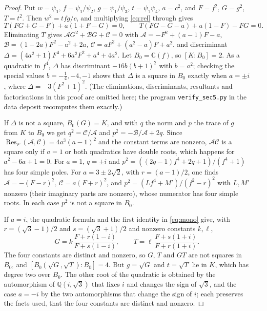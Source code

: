 \documentclass[11pt]{amsart}
\theoremstyle{definition}
\newcommand{\C}{\mathbb{C}}
\begin{document}
\begin{proof}
Put $w=\psi_1$, $f=\psi_1/\psi_2$, $g=\psi_1/\psi_3$, $t=\psi_1\psi_4$, $a=c^2$, and $F=f^2$, $G=g^2$,
$T=t^2$. Then $w^2=tfg/c$, and multiplying \eqref{eq:rel} through gives
\begin{equation}\label{eq:mono}
T(FG+G-F)+a(1+F-G)=0,\qquad T(FG-G-a)+a(1-F)-FG=0.
\end{equation}
Eliminating $T$ gives $\mathcal A G^2+\mathcal B G+\mathcal C=0$ with
$\mathcal A=-F^2+(a-1)F-a$, $\mathcal B=(1-2a)F^2-a^2+2a$, $\mathcal C=aF^2+(a^2-a)F+a^2$, and discriminant
$\Delta=(4a^2+1)F^4+6a^2F^2+a^4+4a^2$. Let $B_0=\C(f)$, so $[K:B_0]=2$. As a quadratic in $f^4$, $\Delta$ has
discriminant $-16b(b+1)^2$ with $b=a^2$; checking the special values $b=-\tfrac14,-4,-1$ shows that $\Delta$ is a
square in $B_0$ exactly when $a=\pm i$, where $\Delta=-3(F^2+1)^2$. (The eliminations, discriminants, resultants and
factorisations in this proof are omitted here; the program \texttt{verify\_sec5.py} in the data deposit recomputes
them exactly.)

If $\Delta$ is not a square, $B_0(G)=K$, and with $q$ the norm and $p$ the trace of $g$ from $K$ to $B_0$ we get
$q^2=\mathcal C/\mathcal A$ and $p^2=-\mathcal B/\mathcal A+2q$. Since $\operatorname{Res}_F(\mathcal A,\mathcal C)
=4a^3(a-1)^2$ and the constant terms are nonzero, $\mathcal A\mathcal C$ is a square only if $a=1$ or both quadratics
have double roots, which happens for $a^2-6a+1=0$. For $a=1$, $q=\pm i$ and
$p^2=((2q-1)f^4+2q+1)/(f^4+1)$ has four simple poles. For $a=3\pm2\sqrt2$, with $r=(a-1)/2$, one finds
$\mathcal A=-(F-r)^2$, $\mathcal C=a(F+r)^2$, and $p^2=(Lf^4+M')/(f^2-r)^2$ with $L,M'$ nonzero (their imaginary
parts are nonzero), whose numerator has four simple roots. In each case $p^2$ is not a square in $B_0$.

If $a=i$, the quadratic formula and the first identity in
\eqref{eq:mono} give, with $r=(\sqrt3-1)/2$ and $s=(\sqrt3+1)/2$ and nonzero constants $k,\ell$,
\[
G=k\,\frac{F+r(1-i)}{F+s(1-i)},\qquad T=\ell\,\frac{F+s(1+i)}{F+r(1+i)}.
\]
The four constants are distinct and nonzero, so $G$, $T$ and $GT$ are not squares in $B_0$, and
$[B_0(\sqrt G,\sqrt T):B_0]=4$. But $g=\sqrt G$ and $t=\sqrt T$ lie in $K$, which has degree two over $B_0$. The other root of the quadratic
is obtained by the automorphism of $\mathbb Q(i,\sqrt3)$ that fixes $i$ and changes the sign of $\sqrt3$, and the
case $a=-i$ by the two automorphisms that change the sign of $i$; each preserves the facts used, that the four
constants are distinct and nonzero.
\end{proof}
\end{document}

